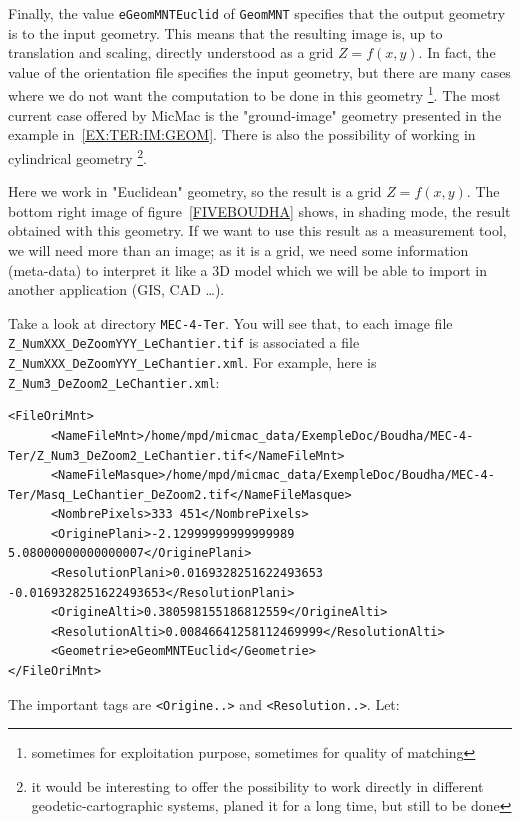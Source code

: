 Finally, the value {\tt eGeomMNTEuclid} of {\tt GeomMNT} specifies that the output
geometry  is   to the input geometry.  This means that the resulting image
is, up to translation and scaling, directly understood as a grid $Z=f(x,y)$.
In fact, the value of the orientation file specifies the input geometry, but
there are many cases where we do
not want the computation to be done in this geometry \footnote{sometimes for exploitation
purpose, sometimes for quality of matching}. The most current case offered by MicMac
is the "ground-image" geometry presented in the example in~\ref{EX:TER:IM:GEOM}. There
is also the possibility of working in cylindrical geometry \footnote{it would be
interesting to offer the possibility to work directly in different geodetic-cartographic
systems, planed it for a long time, but still to be done}.

Here we work in "Euclidean" geometry, so the result is a grid $Z=f(x,y)$.
The bottom right image of figure~\ref{FIVEBOUDHA} shows, in shading mode,
the result obtained with this geometry. If we want to use this result
as a measurement tool, we will need more than an image; as it is a grid, we need some
information (meta-data)  to interpret it like a 3D model which we will
be able to import in another application (GIS, CAD \dots).

Take a look at directory {\tt MEC-4-Ter}. You will see that, to each
image file {\tt Z\_NumXXX\_DeZoomYYY\_LeChantier.tif} is associated a file
{\tt Z\_NumXXX\_DeZoomYYY\_LeChantier.xml}. For example, here is
{\tt Z\_Num3\_DeZoom2\_LeChantier.xml}:

{\scriptsize
\begin{verbatim}
<FileOriMnt>
      <NameFileMnt>/home/mpd/micmac_data/ExempleDoc/Boudha/MEC-4-Ter/Z_Num3_DeZoom2_LeChantier.tif</NameFileMnt>
      <NameFileMasque>/home/mpd/micmac_data/ExempleDoc/Boudha/MEC-4-Ter/Masq_LeChantier_DeZoom2.tif</NameFileMasque>
      <NombrePixels>333 451</NombrePixels>
      <OriginePlani>-2.12999999999999989 5.08000000000000007</OriginePlani>
      <ResolutionPlani>0.0169328251622493653 -0.0169328251622493653</ResolutionPlani>
      <OrigineAlti>0.380598155186812559</OrigineAlti>
      <ResolutionAlti>0.00846641258112469999</ResolutionAlti>
      <Geometrie>eGeomMNTEuclid</Geometrie>
</FileOriMnt>

\end{verbatim}
}

The important tags are {\tt <Origine..>} and {\tt <Resolution..>}. Let:

